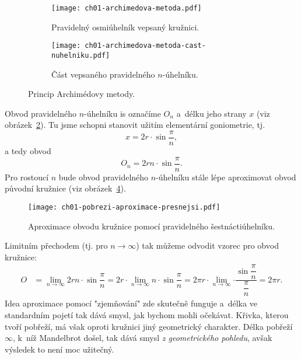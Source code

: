 \begin{figure}[h]
    \centering
    \begin{subfigure}{\subfigwidth}
        \centering
        \texttt{[image: ch01-archimedova-metoda.pdf]}
        \caption{Pravidelný osmiúhelník vepsaný kružnici.}
        \label{subfig:archimedova_metoda}
    \end{subfigure}
    \quad
    \begin{subfigure}{\subfigwidth}
        \centering
        \texttt{[image: ch01-archimedova-metoda-cast-nuhelniku.pdf]}
        \caption{Část vepsaného pravidelného $n$-úhelníku.}
        \label{subfig:archimedova_metoda_cast_nuhelniku}
    \end{subfigure}
    \caption{Princip Archimédovy metody.}
    \label{fig:princip_archimedovy_metody}
\end{figure}
Obvod pravidelného $n$-úhelníku is označíme $O_n$ a~délku jeho strany $x$ (viz obrázek~\ref{subfig:archimedova_metoda_cast_nuhelniku}). Tu jsme schopni stanovit užitím elementární goniometrie, tj.
\begin{equation*}
    x=2r\cdot\sin{\dfrac{\pi}{n}},
\end{equation*}
a tedy obvod
\begin{equation*}
    O_n=2rn\cdot\sin{\dfrac{\pi}{n}}.
\end{equation*}
Pro rostoucí $n$ bude obvod pravidelného $n$-úhelníku stále lépe aproximovat obvod původní kružnice (viz obrázek~\ref{fig:archimedova_metoda_presnejsi}).
\begin{figure}[h]
    \centering
    \texttt{[image: ch01-pobrezi-aproximace-presnejsi.pdf]}
    \caption{Aproximace obvodu kružnice pomocí pravidelného šestnáctiúhelníku.}
    \label{fig:archimedova_metoda_presnejsi}
\end{figure}
Limitním přechodem (tj. pro $n\to\infty$) tak můžeme odvodit vzorec pro obvod kružnice:
\begin{align*}
    O&=\lim_{n\to\infty}{2rn\cdot\sin{\dfrac{\pi}{n}}}=2r\cdot\lim_{n\to\infty}{n\cdot\sin{\dfrac{\pi}{n}}}=2\pi r\cdot\lim_{n\to\infty}{\cdot\dfrac{\sin{\dfrac{\pi}{n}}}{\dfrac{\pi}{n}}}=2\pi r.
\end{align*}
Idea aproximace pomocí "zjemňování" zde skutečně funguje a~délka ve standardním pojetí tak dává smysl, jak bychom mohli očekávat. Křivka, kterou tvoří pobřeží, má však oproti kružnici jiný geometrický charakter. Délka pobřeží $\infty$, k~níž Mandelbrot došel, tak dává smysl \emph{z geometrického pohledu}, avšak výsledek to není moc užitečný.
